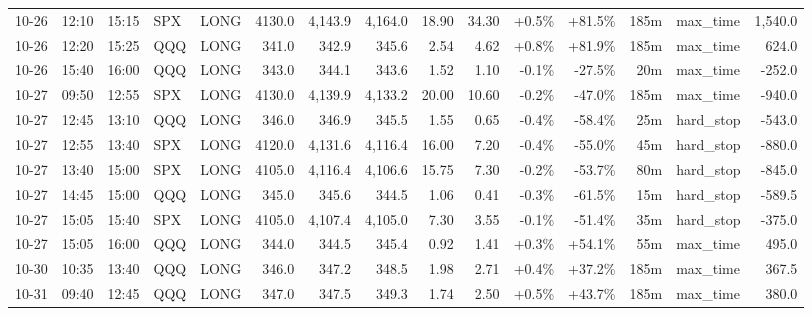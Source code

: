 \documentclass[11pt,a4paper,twoside]{article}
\begin{document}
\begin{landscape}
\begin{center}
\begin{longtable}{>{\color{txtmain}}l l l l l r r r r r r r r >{\color{txtmain}}l r}
10-26 & 12:10 & 15:15 & SPX & LONG & 4130.0 & 4,143.9 & 4,164.0 & 18.90 & 34.30 & \textcolor{wingreen}{+0.5\%} & \textcolor{wingreen}{+81.5\%} & 185m & max\_time & \textcolor{wingreen}{1,540.0} \\
10-26 & 12:20 & 15:25 & QQQ & LONG & 341.0 & 342.9 & 345.6 & 2.54 & 4.62 & \textcolor{wingreen}{+0.8\%} & \textcolor{wingreen}{+81.9\%} & 185m & max\_time & \textcolor{wingreen}{624.0} \\
10-26 & 15:40 & 16:00 & QQQ & LONG & 343.0 & 344.1 & 343.6 & 1.52 & 1.10 & \textcolor{lossred}{-0.1\%} & \textcolor{lossred}{-27.5\%} & 20m & max\_time & \textcolor{lossred}{-252.0} \\
10-27 & 09:50 & 12:55 & SPX & LONG & 4130.0 & 4,139.9 & 4,133.2 & 20.00 & 10.60 & \textcolor{lossred}{-0.2\%} & \textcolor{lossred}{-47.0\%} & 185m & max\_time & \textcolor{lossred}{-940.0} \\
10-27 & 12:45 & 13:10 & QQQ & LONG & 346.0 & 346.9 & 345.5 & 1.55 & 0.65 & \textcolor{lossred}{-0.4\%} & \textcolor{lossred}{-58.4\%} & 25m & hard\_stop & \textcolor{lossred}{-543.0} \\
10-27 & 12:55 & 13:40 & SPX & LONG & 4120.0 & 4,131.6 & 4,116.4 & 16.00 & 7.20 & \textcolor{lossred}{-0.4\%} & \textcolor{lossred}{-55.0\%} & 45m & hard\_stop & \textcolor{lossred}{-880.0} \\
10-27 & 13:40 & 15:00 & SPX & LONG & 4105.0 & 4,116.4 & 4,106.6 & 15.75 & 7.30 & \textcolor{lossred}{-0.2\%} & \textcolor{lossred}{-53.7\%} & 80m & hard\_stop & \textcolor{lossred}{-845.0} \\
10-27 & 14:45 & 15:00 & QQQ & LONG & 345.0 & 345.6 & 344.5 & 1.06 & 0.41 & \textcolor{lossred}{-0.3\%} & \textcolor{lossred}{-61.5\%} & 15m & hard\_stop & \textcolor{lossred}{-589.5} \\
10-27 & 15:05 & 15:40 & SPX & LONG & 4105.0 & 4,107.4 & 4,105.0 & 7.30 & 3.55 & \textcolor{lossred}{-0.1\%} & \textcolor{lossred}{-51.4\%} & 35m & hard\_stop & \textcolor{lossred}{-375.0} \\
10-27 & 15:05 & 16:00 & QQQ & LONG & 344.0 & 344.5 & 345.4 & 0.92 & 1.41 & \textcolor{wingreen}{+0.3\%} & \textcolor{wingreen}{+54.1\%} & 55m & max\_time & \textcolor{wingreen}{495.0} \\
10-30 & 10:35 & 13:40 & QQQ & LONG & 346.0 & 347.2 & 348.5 & 1.98 & 2.71 & \textcolor{wingreen}{+0.4\%} & \textcolor{wingreen}{+37.2\%} & 185m & max\_time & \textcolor{wingreen}{367.5} \\
10-31 & 09:40 & 12:45 & QQQ & LONG & 347.0 & 347.5 & 349.3 & 1.74 & 2.50 & \textcolor{wingreen}{+0.5\%} & \textcolor{wingreen}{+43.7\%} & 185m & max\_time & \textcolor{wingreen}{380.0} \\

\end{longtable}
\end{center}
\end{landscape}
\end{document}
